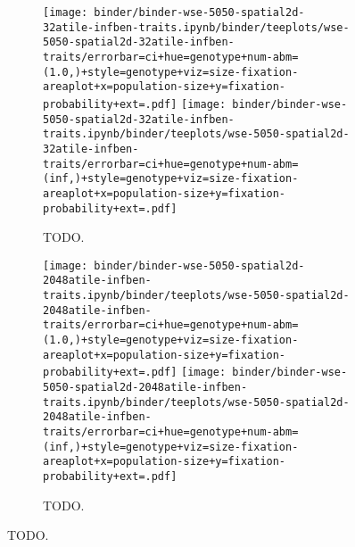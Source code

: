 \begin{figure}[h]
  \begin{minipage}{0.6\textwidth}
  \begin{subfigure}[b]{\linewidth}
    \texttt{[image: binder/binder-wse-5050-spatial2d-32atile-infben-traits.ipynb/binder/teeplots/wse-5050-spatial2d-32atile-infben-traits/errorbar=ci+hue=genotype+num-abm=(1.0,)+style=genotype+viz=size-fixation-areaplot+x=population-size+y=fixation-probability+ext=.pdf]}%
    \texttt{[image: binder/binder-wse-5050-spatial2d-32atile-infben-traits.ipynb/binder/teeplots/wse-5050-spatial2d-32atile-infben-traits/errorbar=ci+hue=genotype+num-abm=(inf,)+style=genotype+viz=size-fixation-areaplot+x=population-size+y=fixation-probability+ext=.pdf]}
    \caption{\footnotesize TODO.}
    \label{fig:wse-inf-one:32}
  \end{subfigure}%

  \begin{subfigure}[b]{\linewidth}
    \texttt{[image: binder/binder-wse-5050-spatial2d-2048atile-infben-traits.ipynb/binder/teeplots/wse-5050-spatial2d-2048atile-infben-traits/errorbar=ci+hue=genotype+num-abm=(1.0,)+style=genotype+viz=size-fixation-areaplot+x=population-size+y=fixation-probability+ext=.pdf]}%
    \texttt{[image: binder/binder-wse-5050-spatial2d-2048atile-infben-traits.ipynb/binder/teeplots/wse-5050-spatial2d-2048atile-infben-traits/errorbar=ci+hue=genotype+num-abm=(inf,)+style=genotype+viz=size-fixation-areaplot+x=population-size+y=fixation-probability+ext=.pdf]}
    \caption{\footnotesize TODO.}
    \label{fig:wse-inf-one:2048}
  \end{subfigure}
  \end{minipage}%
  \begin{minipage}{0.4\textwidth}
    \caption{TODO.}
    \label{fig:wse-inf-one}
  \end{minipage}
\end{figure}
